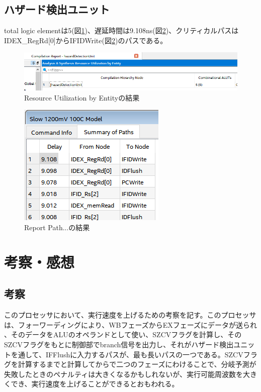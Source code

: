 \documentclass[a4j,titlepage]{jarticle}
\begin{document}
\subsection{ハザード検出ユニット}
total logic elementは5(図\ref{hazardtotallogicelement0603})、遅延時間は9.108ns(図\ref{hazardreportpath})、クリティカルパスはIDEX\_RegRd[0]からIFIDWrite(図\ref{hazardreportpath})のパスである。

\begin{figure}[H]
    \begin{center}
    \includegraphics[scale = 0.62]{hazardtotallogicelement0603.PNG}
    \end{center}
    \caption{Resource Utilization by Entityの結果}
    \label{hazardtotallogicelement0603}
\end{figure}

\begin{figure}[H]
    \begin{center}
    \includegraphics[scale = 1.2]{hazardreportpath.PNG}
    \end{center}
    \caption{Report Path...の結果}
    \label{hazardreportpath}
\end{figure}

\section{考察・感想}
\subsection{考察}
このプロセッサにおいて、実行速度を上げるための考察を記す。このプロセッサは、フォーワーディングにより、WBフェーズからEXフェーズにデータが送られ
、そのデータをALUのオペランドとして使い、SZCVフラグを計算し、そのSZCVフラグをもとに制御部でbranch信号を出力し、それがハザード検出ユニットを通して、IFFlushに入力するパスが、最も長いパスの一つである。SZCVフラグを計算するまでと計算してからで二つのフェーズにわけることで、分岐予測が失敗したときのペナルティは大きくなるかもしれないが、実行可能周波数を大きくでき、実行速度を上げることができるとおもわれる。
\end{document}
